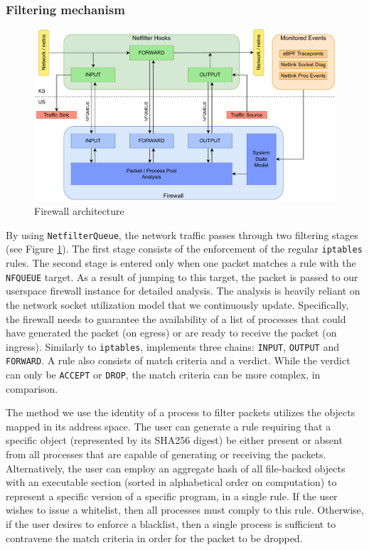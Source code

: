 \subsubsection{Filtering mechanism}

\begin{figure}
    \centering
    \includegraphics[width=\textwidth,keepaspectratio]{figures/daf-fw-architecture.pdf}
    \caption{Firewall architecture}
    \label{appfw:daf:fig:fw-architecture}
\end{figure}

By using \texttt{NetfilterQueue}, the network traffic passes through two filtering stages (see Figure \ref{appfw:daf:fig:fw-architecture}). The first stage consists of the enforcement of the regular \texttt{iptables} rules. The second stage is entered only when one packet matches a rule with the \texttt{NFQUEUE} target. As a result of jumping to this target, the packet is passed to our userspace firewall instance for detailed analysis. The analysis is heavily reliant on the network socket utilization model that we continuously update. Specifically, the firewall needs to guarantee the availability of a list of processes that could have generated the packet (on egress) or are ready to receive the packet (on ingress). Similarly to \texttt{iptables}, \daf{} implements three chains: \texttt{INPUT}, \texttt{OUTPUT} and \texttt{FORWARD}. A \daf{} rule also consists of match criteria and a verdict. While the verdict can only be \texttt{ACCEPT} or \texttt{DROP}, the match criteria can be more complex, in comparison.

The method we use the identity of a process to filter packets utilizes the objects mapped in its address space. The user can generate a rule requiring that a specific object (represented by its SHA256 digest) be either present or absent from all processes that are capable of generating or receiving the packets. Alternatively, the user can employ an aggregate hash of all file-backed objects with an executable section (sorted in alphabetical order on computation) to represent a specific version of a specific program, in a single rule. If the user wishes to issue a whitelist, then all processes must comply to this rule. Otherwise, if the user desires to enforce a blacklist, then a single process is sufficient to contravene the match criteria in order for the packet to be dropped.

